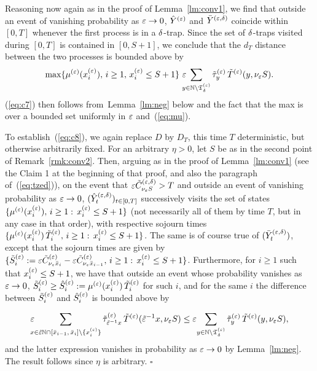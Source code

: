 Reasoning now again as in the proof of Lemma~\ref{lm:conv1}, we find that outside 
an event of vanishing probability as $\varepsilon\to0$, $\hat Y^{(\varepsilon)}$ and $\bar Y^{(\varepsilon,\delta)}$ coincide within $[0,T]$ 
whenever the first process is in a $\delta$-trap. Since the set of $\delta$-traps visited during $[0,T]$ 
is contained in $[0,S+1]$, we conclude that the $d_T$ distance between the two processes is bounded 
above by 
\begin{equation}
\label{eq:c9}
\max\{\mue(\xe_i),\,i\geq1,\,\xe_i\leq S+1\}\,\,\eps\!\!\!\!
\sum_{y\in\N\setminus\teps_\delta} \tilde\tau_{y}^{(\eps)}\,\bte(y,\nu_\eps S).
\end{equation}
(\ref{eq:c7}) then follows from~Lemma~\ref{lm:neg} below and the fact that 
the max is over a bounded set uniformly in $\varepsilon$ and~(\ref{eq:mu}).


To establish~(\ref{eq:c8}), we again replace $D$ by $D_T$, this time $T$ deterministic, but otherwise 
arbitrarily fixed. For an arbitrary $\eta>0$, let $S$ be as in the second point of Remark~\ref{rmk:conv2}. 
Then, arguing as in the proof of Lemma~\ref{lm:conv1} (see the Claim 1 at the beginning of that 
proof, and also the paragraph of~(\ref{eq:tzed})), on the event that $\varepsilon\tilde C^{(\varepsilon,\delta)}_{\nu_\varepsilon S}>T$ and outside 
an event of vanishing probability as $\varepsilon\to0$, $(\hat Y^{(\varepsilon,\delta)}_t)_{t\in[0,T]}$ successively visits the set of states 
$\{\mu^{(\varepsilon)}(x^{(\varepsilon)}_i),\,i\geq1:\,x^{(\varepsilon)}_i\leq S+1\}$ (not necessarily all of them by time $T$, but in any case in that order),
with respective sojourn times 
$\{\mu^{(\varepsilon)}(x^{(\varepsilon)}_i)\,\tilde T^{(\varepsilon)}_i,\,i\geq1:\,x^{(\varepsilon)}_i\leq S+1\}$.
The same is of course true of $(\bar Y^{(\varepsilon,\delta)}_t)$, except that the sojourn times are given by 
$\{\tilde S^{(\varepsilon)}_i:=\varepsilon\tilde C^{(\varepsilon)}_{\nu_\varepsilon\bar x_{i}}-\varepsilon\tilde C^{(\varepsilon)}_{\nu_\varepsilon\bar x_{i-1}},\,i\geq1:\,x^{(\varepsilon)}_i\leq S+1\}$.                    
Furthermore, for $i\geq1$ such that $x^{(\varepsilon)}_i\leq S+1$, we have that outside an event whose probability vanishes as $\varepsilon\to0$,
$\tilde S^{(\varepsilon)}_i\geq\hat S^{(\varepsilon)}_i:=\mu^{(\varepsilon)}(x^{(\varepsilon)}_i)\, \tilde T^{(\varepsilon)}_i$ for such $i$, 
and for the same $i$ the difference between $\tilde S^{(\varepsilon)}_i$ and $\hat S^{(\varepsilon)}_i$ is bounded above by




















\begin{equation}
\label{eq:c10}
\eps\!\!\!\!\sum_{x\in\te\N\cap[\bar x_{i-1},\,\bar x_{i}]\setminus\{\xe_i\}}
\tilde\tau_{\te^{-1}x}^{(\eps)} \,\bte(\te^{-1}x,\nu_\eps S)
\leq
\eps\!\sum_{y\in\N\setminus\teps_\delta}\tilde\tau_{y}^{(\eps)}\,\bte(y,\nu_\eps S),
\end{equation}
and the latter expression vanishes in probability as $\varepsilon\to0$
by Lemma~\ref{lm:neg}. The result follows since $\eta$ is arbitrary.
$\square$


